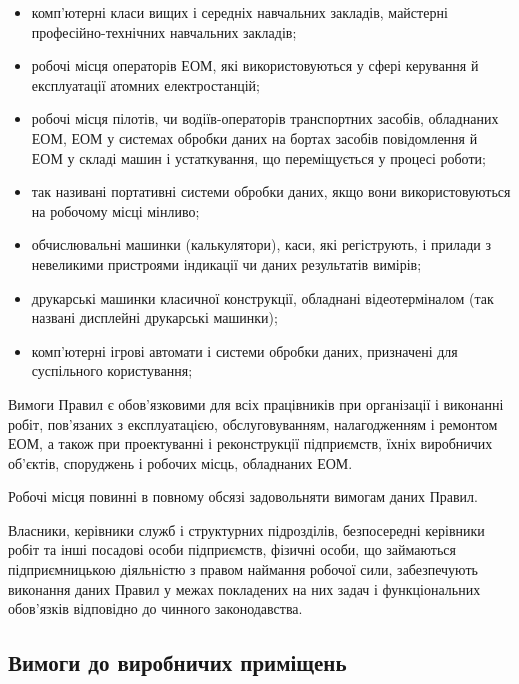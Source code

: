 \documentclass[simple,a4paper,14pt,ukrainian,utf8]{eskdtext}
\begin{document}
\begin{appendices}
                \begin{itemize}
                    \item комп'ютерні класи вищих і середніх навчальних закладів, майстерні професійно-технічних навчальних закладів;
                    \item робочі місця операторів ЕОМ, які використовуються у сфері керування й експлуатації атомних електростанцій;
                    \item робочі місця пілотів, чи водіїв-операторів транспортних засобів, обладнаних ЕОМ, ЕОМ у системах обробки даних на бортах засобів повідомлення й ЕОМ у складі машин і устаткування, що переміщується у процесі роботи;
                    \item так називані портативні системи обробки даних, якщо вони використовуються на робочому місці мінливо;
                    \item обчислювальні машинки (калькулятори), каси, які регіструють, і прилади з невеликими пристроями індикації чи даних результатів вимірів;
                    \item друкарські машинки класичної конструкції, обладнані відеотерміналом (так названі дисплейні друкарські машинки);
                    \item комп'ютерні ігрові автомати і системи обробки даних, призначені для суспільного користування;
                \end{itemize}

                Вимоги Правил є обов'язковими для всіх працівників при організації і виконанні робіт, пов'язаних з експлуатацією, обслуговуванням, налагодженням і ремонтом ЕОМ, а також при проектуванні і реконструкції підприємств, їхніх виробничих об'єктів, споруджень і робочих місць, обладнаних ЕОМ.

                Робочі місця повинні в повному обсязі задовольняти вимогам даних Правил.

                Власники, керівники служб і структурних підрозділів, безпосередні керівники робіт та інші посадові особи підприємств, фізичні особи, що займаються підприємницькою діяльністю з правом наймання робочої сили, забезпечують виконання даних Правил у межах покладених на них задач і функціональних обов'язків відповідно до чинного законодавства.

            \subsection{Вимоги до виробничих приміщень}


\end{appendices}
\end{document}
